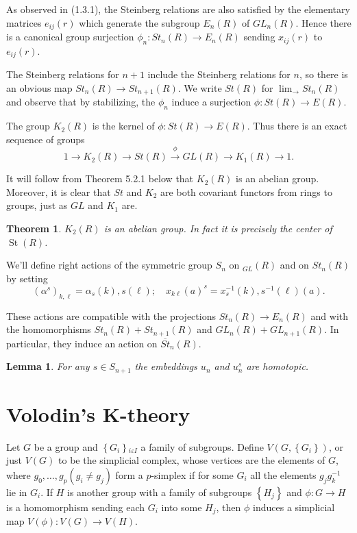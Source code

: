 \documentclass{book}
\newtheorem{theo}{Theorem}
\newtheorem{lemm}{Lemma}
\begin{document}
As observed in (1.3.1), the Steinberg relations are also satisfied by the elementary matrices $e_{i j}(r)$ which generate the subgroup $E_n(R)$ of $G L_n(R)$. Hence there is a canonical group surjection $\phi_n: S t_n(R) \rightarrow E_n(R)$ sending $x_{i j}(r)$ to $e_{i j}(r)$.

The Steinberg relations for $n+1$ include the Steinberg relations for $n$, so there is an obvious map $S t_n(R) \rightarrow S t_{n+1}(R)$. We write $S t(R)$ for $\lim _{\longrightarrow} S t_n(R)$ and observe that by stabilizing, the $\phi_n$ induce a surjection $\phi: S t(R) \rightarrow E(R)$.


The group $K_2(R)$ is the kernel of $\phi: S t(R) \rightarrow E(R)$. Thus there is an exact sequence of groups
$$
1 \rightarrow K_2(R) \rightarrow S t(R) \xrightarrow{\phi} G L(R) \rightarrow K_1(R) \rightarrow 1 .
$$

It will follow from Theorem 5.2.1 below that $K_2(R)$ is an abelian group. Moreover, it is clear that $S t$ and $K_2$ are both covariant functors from rings to groups, just as $G L$ and $K_1$ are.

\begin{theo}
$K_2(R)$ is an abelian group. In fact it is precisely the center of $\operatorname{St}(R)$.
\end{theo}

We'll define right actions of the symmetric group $S_n$ on ${ }_{G L}(R)$ and on $S t_n(R)$ by setting
$$
\left(\alpha^s\right)_{k, \ell}=\alpha_s(k), s(\ell) ; \quad x_{k \ell}(a)^s=x_s^{-1}(k), s^{-1}(\ell)(a) .
$$

These actions are compatible with the projections $S t_n(R) \rightarrow E_n(R)$ and with the homomorphisms $S t_n(R)+S t_{n+1}(R)$ and $G L_n(R)+G L_{n+1}(R)$. In particular, they induce an action on $\overline{S t}_n(R)$.

\begin{lemm}
    For any $s \in S_{n+1}$ the embeddings $u_n$ and $u_n^s$ are homotopic.
\end{lemm} 





\section{Volodin's K-theory}

Let $G$ be a group and $\left\{G_i\right\}{ }_{i \varepsilon I}$ a family of subgroups. Define $V\left(G,\left\{G_i\right\}\right)$, or just $V(G)$ to be the simplicial complex, whose vertices are the elements of $G$, where $g_0, \ldots, g_p\left(g_i \neq g_j\right)$ form a $p$-simplex if for some $G_i$ all the elements $g_j g_k^{-1}$ lie in $G_i$. If $H$ is another group with a family of subgroups $\left\{H_j\right\}$ and $\phi: G \rightarrow H$ is a homomorphism sending each $G_i$ into some $H_j$, then $\phi$ induces a simplicial map $V(\phi): V(G) \rightarrow V(H)$.
\end{document}
